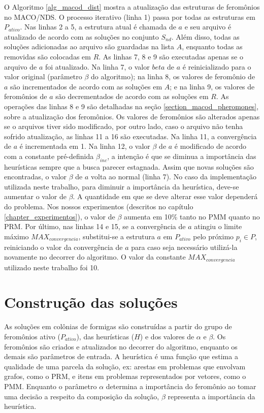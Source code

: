 O Algoritmo \ref{alg_macod_dist} mostra a atualização das estruturas de feromônios no MACO/NDS. O processo iterativo (linha 1) passa por todas as estruturas em $P_{ativo}$. Nas linhas 2 a 5, a estrutura atual é chamada de $a$ e seu arquivo é atualizado de acordo com as soluções no conjunto $S_{nd}$. Além disso, todas as soluções adicionadas ao arquivo são guardadas na lista $A$, enquanto todas as removidas são colocadas em $R$. As linhas 7, 8 e 9 são executadas apenas se o arquivo de $a$ foi atualizado. Na linha 7, o valor $beta$ de $a$ é reinicializado para o valor original (parâmetro $\beta$ do algoritmo); na linha 8, os valores de feromônio de $a$ são incrementados de acordo com as soluções em $A$; e na linha 9, os valores de feromônios de $a$ são decrementados de acordo com as soluções em $R$. As operações das linhas 8 e 9 são detalhadas na seção \ref{section_macod_pheromones}, sobre a atualização dos feromônios. Os valores de feromônios são alterados apenas se o arquivos tiver sido modificado, por outro lado, caso o arquivo não tenha sofrido atualização, as linhas 11 a 16 são executadas. Na linha 11, a convergência de $a$ é incrementada em 1. Na linha 12, o valor $\beta$ de $a$ é modificado de acordo com a constante pré-definida $\beta_{inc}$, a intenção é que se diminua a importância das heurísticas sempre que a busca parecer estagnada. Assim que novas soluções são encontradas, o valor $\beta$ de $a$ volta ao normal (linha 7). No caso da implementação utilizada neste trabalho, para diminuir a importância da heurística, deve-se aumentar o valor de $\beta$. A quantidade em que se deve alterar esse valor dependerá do problema. Nos nossos experimentos (descritos no capítulo \ref{chapter_experimentos}), o valor de $\beta$ aumenta em 10\% tanto no PMM quanto no PRM. Por último, nas linhas 14 e 15, se a convergência de $a$ atingiu o limite máximo $MAX_{convergencia}$, substitui-se a estrutura $a$ em $P_{ativo}$ pelo próximo $p_i \in P$, reiniciando o valor da convergência de $a$ para caso seja necessário utilizá-la novamente no decorrer do algoritmo. O valor da constante $MAX_{convergencia}$ utilizado neste trabalho foi 10.

\section{Construção das soluções}
\label{section_macod_solutions}

As soluções em colônias de formigas são construídas a partir do grupo de feromônios ativo ($P_{ativo}$), das heurísticas ($H$) e dos valores de $\alpha$ e $\beta$. Os feromônios são criados e atualizados no decorrer do algoritmo, enquanto os demais são parâmetros de entrada. A heurística é uma função que estima a qualidade de uma parcela da solução, ex: arestas em problemas que envolvam grafos, como o PRM, e itens em problemas representados por vetores, como o PMM. Enquanto o parâmetro $\alpha$ determina a importância do feromônio ao tomar uma decisão a respeito da composição da solução, $\beta$ representa a importância da heurística.

